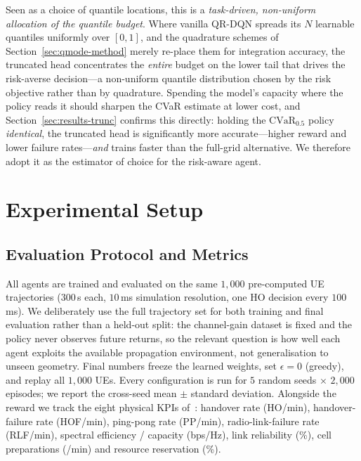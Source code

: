 \documentclass[conference]{IEEEtran}
\begin{document}
Seen as a choice of quantile locations, this is a \emph{task-driven, non-uniform
allocation of the quantile budget}. Where vanilla QR-DQN spreads its $N$ learnable
quantiles uniformly over $[0,1]$, and the quadrature schemes of
Section~\ref{sec:qmode-method} merely re-place them for integration accuracy, the
truncated head concentrates the \emph{entire} budget on the lower tail that drives
the risk-averse decision---a non-uniform quantile distribution chosen by the risk
objective rather than by quadrature. Spending the model's capacity where the policy
reads it should sharpen the CVaR estimate at lower cost, and
Section~\ref{sec:results-trunc} confirms this directly: holding the
$\mathrm{CVaR}_{0.5}$ policy \emph{identical}, the truncated head is significantly
more accurate---higher reward and lower failure rates---\emph{and} trains faster
than the full-grid alternative. We therefore adopt it as the estimator of choice
for the risk-aware agent.

\section{Experimental Setup}
\label{sec:setup}

\subsection{Evaluation Protocol and Metrics}
All agents are trained and evaluated on the same $1{,}000$ pre-computed UE
trajectories ($300$\,s each, $10$\,ms simulation resolution, one HO decision
every $100$\,ms). We deliberately use the full trajectory set for both
training and final evaluation rather than a held-out split: the channel-gain
dataset is fixed and the policy never observes future returns, so the relevant
question is how well each agent exploits the available propagation environment,
not generalisation to unseen geometry. Final numbers freeze the learned
weights, set $\epsilon=0$ (greedy), and replay all $1{,}000$ UEs. Every
configuration is run for $5$ random seeds $\times$ $2{,}000$ episodes; we
report the cross-seed mean $\pm$ standard deviation. Alongside the reward we
track the eight physical KPIs of~\cite{cmab_ho}: handover rate (HO/min),
handover-failure rate (HOF/min), ping-pong rate (PP/min), radio-link-failure
rate (RLF/min), spectral efficiency / capacity (bps/Hz), link reliability
(\%), cell preparations (/min) and resource reservation (\%).
\end{document}

